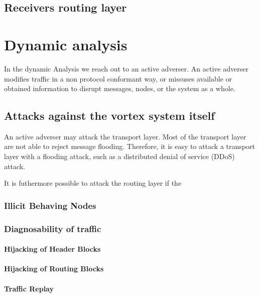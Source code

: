 \section{Receivers routing layer}

\chapter{Dynamic analysis}
In the dynamic Analysis we reach out to an active adverser. An active adverser modifies traffic in a non protocol conformant way, or missuses available or obtained information to disrupt messages, nodes, or the system as a whole.

\section{Attacks against the vortex system itself}
An active adverser may attack the transport layer. Most of the transport layer are not able to reject message flooding. Therefore, it is easy to attack a transport layer with a flooding attack, such as a distributed denial of service (DDoS) attack.

It is futhermore possible to attack the routing layer if the 

\subsection{Illicit Behaving Nodes}

\subsection{Diagnosability of traffic}

\subsubsection{Hijacking of Header Blocks}

\subsubsection{Hijacking of Routing Blocks}

\subsubsection{Traffic Replay}

